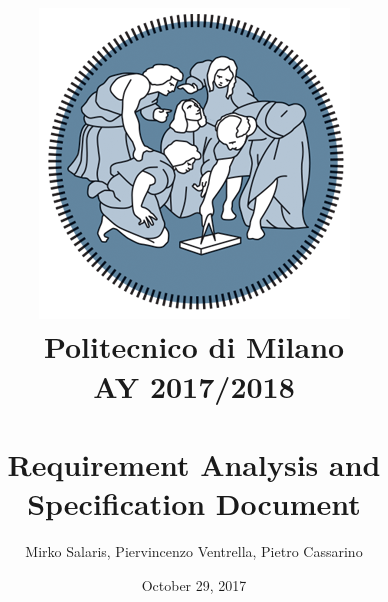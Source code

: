 \begin{titlepage}

\title{
	\includegraphics[scale=0.5]{Images/PolimiLogo}
	\\
	\normalsize{Politecnico di Milano}\\
	{AY 2017/2018}
	\bigskip\\
	\bigskip\\
	\LARGE{Requirement Analysis and Specification Document}
	\vfill
}

	\date{October 29, 2017}

\author{
	Mirko Salaris,
	Piervincenzo Ventrella,
	Pietro Cassarino
}

\maketitle
\thispagestyle{empty}

\end{titlepage}